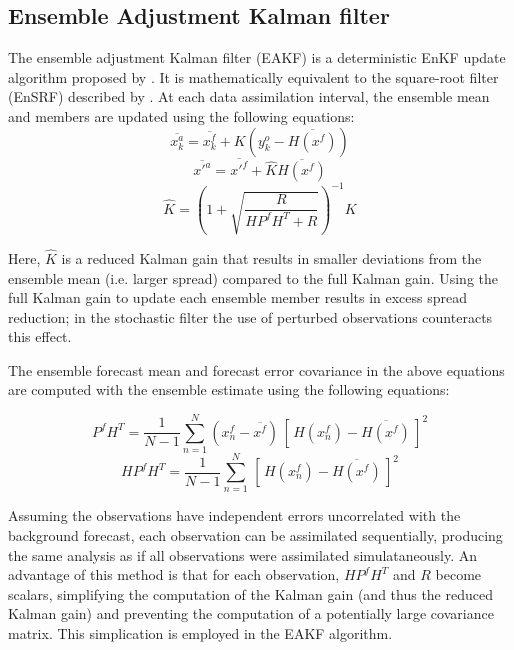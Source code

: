 \subsection{Ensemble Adjustment Kalman filter}
\label{eakf}
The ensemble adjustment Kalman filter (EAKF) is a deterministic EnKF update algorithm proposed by \citet{anderson01}. It is mathematically equivalent to the square-root filter (EnSRF) described by \citet{whitakerhamill02}. At each data assimilation interval, the ensemble mean and members are updated using the following equations:
\begin{equation}
   \overline{x_k^a} = \overline{x_k^f} + K(y_k^o - \overline{H(x^f)})
\end{equation}
\begin{equation}
   \overline{x'^a} = \overline{x'^f} + \hat{K}\overline{H(x^f)}
\end{equation}
\begin{equation}
   \hat{K} = (1 + \sqrt{\frac{R}{HP^fH^T + R}})^{-1}K
\end{equation}

Here, \( \hat{K} \) is a reduced Kalman gain that results in smaller deviations from the ensemble mean (i.e. larger spread) compared to the full Kalman gain. Using the full Kalman gain to update each ensemble member results in excess spread reduction; in the stochastic filter the use of perturbed observations counteracts this effect. 
	
The ensemble forecast mean and forecast error covariance in the above equations are computed with the ensemble estimate using the following equations:

\begin{equation}
   P^fH^T = \frac{1}{N-1}\sum_{n=1}^{N}(x_n^f - \overline{x^f})\,[\,H(x_n^f) - \overline{H(x^f)}\,]^2
\end{equation}
\begin{equation}
   HP^fH^T = \frac{1}{N-1}\sum_{n=1}^{N}\,[\,H(x_n^f) - \overline{H(x^f)}\,]^2
\end{equation}

Assuming the observations have independent errors uncorrelated with the background forecast, each observation can be assimilated sequentially, producing the same analysis as if all observations were assimilated simulataneously. An advantage of this method is that for each observation, \( HP^fH^T \) and \( R \) become scalars, simplifying the computation of the Kalman gain (and thus the reduced Kalman gain) and preventing the computation of a potentially large covariance matrix. This simplication is employed in the EAKF algorithm.

